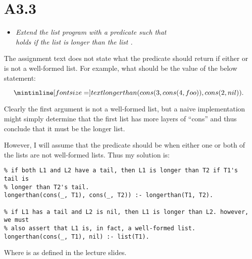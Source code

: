 
\newpage
\section{A3.3}

\begin{itemize}
  \item \emph{Extend the list program with a predicate  such
    that\\  holds if the list  is longer than the
    list .}
\end{itemize}

The assignment text does not state what the predicate should return if either
 or  is not a well-formed list. For example, what should be the
value of the below statement:

$$
\ms{longerthan(cons(3, cons(4, foo)), cons(2, nil)).}
$$

Clearly the first argument is not a well-formed list, but a naive implementation
might simply determine that the first list has more layers of ``cons'' and thus
conclude that it must be the longer list.

\medskip

However, I will assume that the predicate should be  when either one
or both of the lists are not well-formed lists. Thus my solution is:

\begin{verbatim}
% if both L1 and L2 have a tail, then L1 is longer than T2 if T1's tail is
% longer than T2's tail.
longerthan(cons(_, T1), cons(_, T2)) :- longerthan(T1, T2).

% if L1 has a tail and L2 is nil, then L1 is longer than L2. however, we must
% also assert that L1 is, in fact, a well-formed list.
longerthan(cons(_, T1), nil) :- list(T1).
\end{verbatim}

Where  is as defined in the lecture slides.

\Sectend
